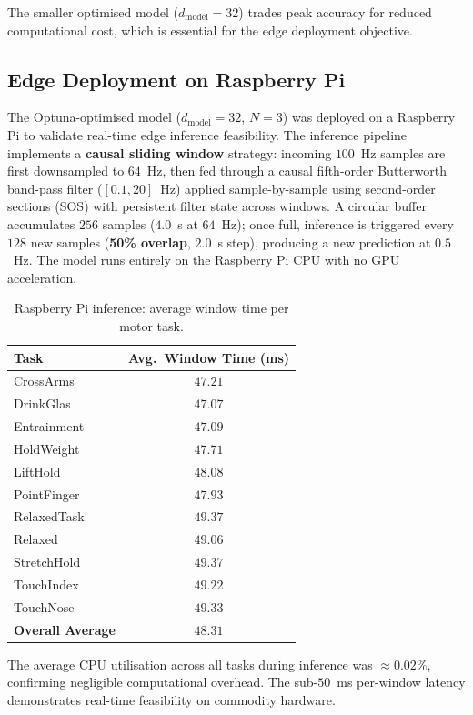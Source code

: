 \documentclass[conference]{IEEEtran}
\begin{document}
The smaller optimised model ($d_{\text{model}}{=}32$) trades peak accuracy for reduced computational cost, which is essential for the edge deployment objective.


\subsection{Edge Deployment on Raspberry Pi}
\label{sec:pi}

The Optuna-optimised model ($d_{\text{model}}{=}32$, $N{=}3$) was deployed on a Raspberry Pi to validate real-time edge inference feasibility. The inference pipeline implements a \textbf{causal sliding window} strategy: incoming $100$~Hz samples are first downsampled to $64$~Hz, then fed through a causal fifth-order Butterworth band-pass filter ($[0.1, 20]$~Hz) applied sample-by-sample using second-order sections (SOS) with persistent filter state across windows. A circular buffer accumulates $256$ samples ($4.0$~s at $64$~Hz); once full, inference is triggered every $128$ new samples (\textbf{50\% overlap}, $2.0$~s step), producing a new prediction at $0.5$~Hz. The model runs entirely on the Raspberry Pi CPU with no GPU acceleration.

\begin{table}[H]
\centering
\caption{Raspberry Pi inference: average window time per motor task.}
\label{tab:pi}
\begin{tabular}{lc}
\toprule
\textbf{Task} & \textbf{Avg.\ Window Time (ms)} \\
\midrule
CrossArms    & $47.21$ \\
DrinkGlas    & $47.07$ \\
Entrainment  & $47.09$ \\
HoldWeight   & $47.71$ \\
LiftHold     & $48.08$ \\
PointFinger  & $47.93$ \\
RelaxedTask  & $49.37$ \\
Relaxed      & $49.06$ \\
StretchHold  & $49.37$ \\
TouchIndex   & $49.22$ \\
TouchNose    & $49.33$ \\
\midrule
\textbf{Overall Average} & $\mathbf{48.31}$ \\
\bottomrule
\end{tabular}
\end{table}

\noindent The average CPU utilisation across all tasks during inference was $\approx 0.02\%$, confirming negligible computational overhead. The sub-$50$~ms per-window latency demonstrates real-time feasibility on commodity hardware.
\end{document}
